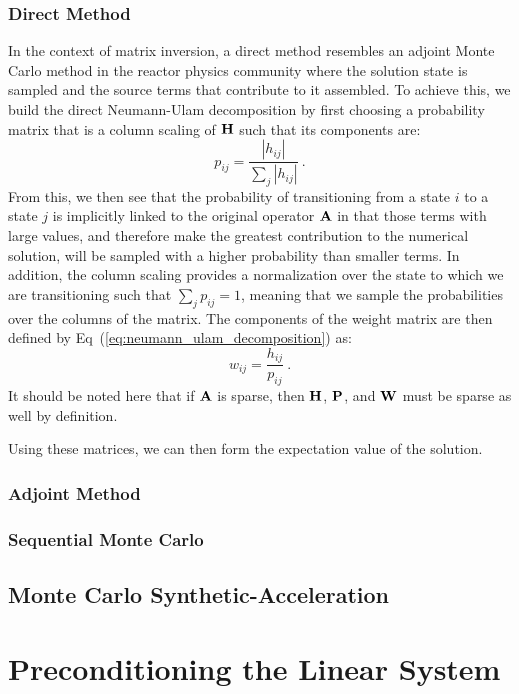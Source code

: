 \subsubsection{Direct Method}
\label{subsubsec:direct_mc}
In the context of matrix inversion, a direct method resembles an
adjoint Monte Carlo method in the reactor physics community where the
solution state is sampled and the source terms that contribute to it
assembled. To achieve this, we build the direct Neumann-Ulam
decomposition by first choosing a probability matrix that is a column
scaling of $\mathbf{H}$ such that its components are:
\begin{equation}
  p_{ij} = \frac{|h_{ij}|}{\sum_j |h_{ij}|}\:.
  \label{eq:direct_probability}
\end{equation}
From this, we then see that the probability of transitioning from a
state $i$ to a state $j$ is implicitly linked to the original operator
$\mathbf{A}$ in that those terms with large values, and therefore make the
greatest contribution to the numerical solution, will be sampled with
a higher probability than smaller terms. In addition, the column
scaling provides a normalization over the state to which we are
transitioning such that $\sum_j p_{ij} = 1$, meaning that we sample
the probabilities over the columns of the matrix. The components of
the weight matrix are then defined by
Eq~(\ref{eq:neumann_ulam_decomposition}) as:
\begin{equation}
  w_{ij} = \frac{h_{ij}}{p_{ij}}\:.
  \label{eq:direct_weight}
\end{equation}
It should be noted here that if $\mathbf{A}$ is sparse, then $\mathbf{H}$,
$\mathbf{P}$, and $\mathbf{W}$ must be sparse as well by definition.

Using these matrices, we can then form the expectation value of the
solution. 

\subsubsection{Adjoint Method}
\label{subsubsec:adjoint_mc}

\subsubsection{Sequential Monte Carlo}
\label{subsusbsec:sequential_mc}

\subsection{Monte Carlo Synthetic-Acceleration}
\label{subsec:mcsa}

\section{Preconditioning the Linear System}
\label{sec:linear_preconditioning}

